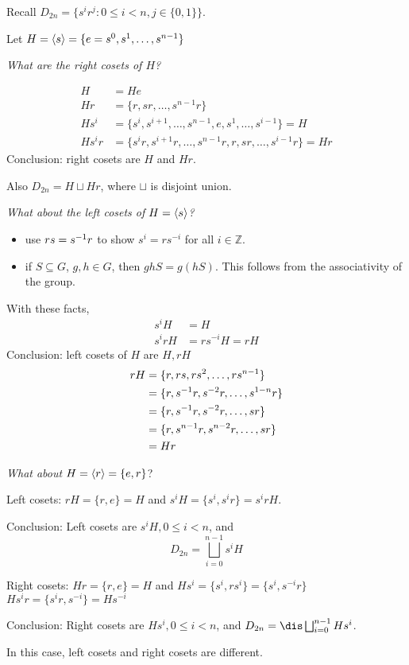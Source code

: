 \begin{ex}
Recall $D_{2n}=\{s^ir^j: 0\le i < n, j\in \{0,1\}\}$.

Let $H=\left\langle s \right\rangle=\{e=s^0,s^1,\ldots,s^{n-1}\}$

\textit{What are the right cosets of $H$?}

$$
\begin{aligned}
H &= He \\
Hr&= \{r,sr,\ldots,s^{n-1}r\}\\
Hs^i &= \{s^i,s^{i+1},\ldots,s^{n-1},e,s^1,\ldots,s^{i-1}\}=H\\
Hs^ir &= \{s^ir,s^{i+1}r,\ldots,s^{n-1}r,r,sr,\ldots,s^{i-1}r\}=Hr
\end{aligned}
$$
Conclusion: right cosets are $H$ and $Hr$.

Also $D_{2n}=H\sqcup Hr$, where $\sqcup$ is disjoint union.

\textit{What about the left cosets of $H=\left\langle s \right\rangle$?}

\begin{exercise}
\begin{itemize}[leftmargin=1em]
\item use $rs=s^{-1} r$ to show $s^i=rs^{-i}$ for all $i\in \mathbb Z$.
\item if $S\subseteq G$, $g,h\in G$, then $ghS=g(hS)$. This follows from the associativity of the group.
\end{itemize}
\end{exercise}
With these facts,
$$
\begin{aligned}
s^iH&=H\\
s^irH &= rs^{-i}H = rH
\end{aligned}
$$
Conclusion: left cosets of $H$ are $H, rH$
$$
\begin{aligned}
rH &= \{r,rs,rs^2,\ldots,rs^{n-1}\}\\
&= \{r,s^{-1} r,s^{-2}r,\ldots,s^{1-n}r\}\\
&= \{r,s^{-1} r,s^{-2}r,\ldots,sr\}\\
&= \{r,s^{n-1}r,s^{n-2}r,\ldots,sr\}\\
&= Hr
\end{aligned}
$$
\end{ex}
\begin{ex}
\textit{What about $H=\left\langle r \right\rangle=\{e,r\}$}?

Left cosets: $rH=\{r,e\}=H$ and $s^i H = \{s^i, s^i r\}= s^irH$.

Conclusion: Left cosets are $s^iH,0\le i<n$, and
$$
D_{2n}= \bigsqcup_{i=0}^{n-1}s^iH
$$

Right cosets: $Hr=\{r,e\}=H$ and $Hs^i=\{s^i,rs^i\}=\{s^i,s^{-i}r\}$\\
$Hs^i r = \{s^ir,s^{-i}\}=Hs^{-i}$

Conclusion: Right cosets are $Hs^i, 0\le i < n$, and $D_{2n}=\dis \bigsqcup_{i=0}^{n-1}Hs^i$.

In this case, left cosets and right cosets are different.
\end{ex}

